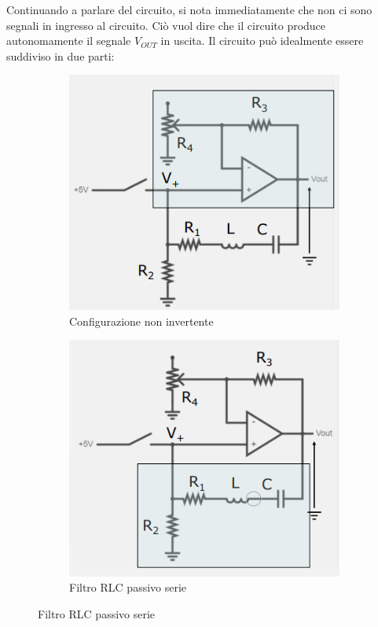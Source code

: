\documentclass{article}
\begin{document}
Continuando a parlare del circuito, si nota immediatamente che non ci sono segnali in ingresso al circuito. Ciò vuol dire che il circuito produce autonomamente il segnale $V_{OUT}$ in uscita. Il circuito può idealmente essere suddiviso in due parti:

\begin{figure}[h]
  \centering
  \begin{subfigure}{0.4 \linewidth}
    \includegraphics[width = \linewidth]{IM_circuito_risonante_serie_attivo_1}
    \caption{Configurazione non invertente}
  \end{subfigure}
  \begin{subfigure}{0.4 \linewidth}
    \includegraphics[width = \linewidth]{IM_circuito_risonante_serie_attivo_2}
    \caption{Filtro RLC passivo serie}
  \end{subfigure}
  \label{Schema_circuito_risonante_serie_attivo_analisi}
\end{figure}
\end{document}
